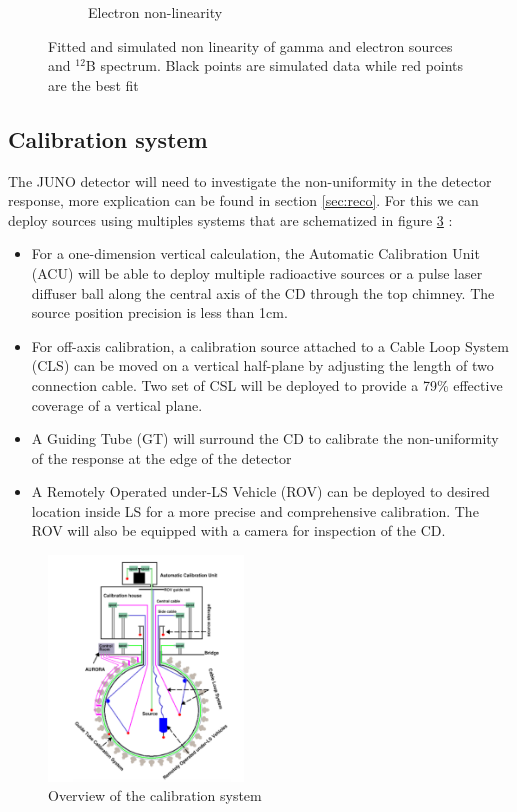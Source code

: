 \begin{figure}[ht]
\begin{subfigure}[b]{0.37\textwidth}
    \caption{Electron non-linearity}
    \label{fig:nl:electron}
  \end{subfigure}
  \caption{Fitted and simulated non linearity of gamma and electron sources and $^{12}$B spectrum. Black points are simulated data while red points are the best fit}
  \label{fig:nl}
\end{figure}

\subsection{Calibration system}

The JUNO detector will need to investigate the non-uniformity in the detector response, more explication can be found in section \ref{sec:reco}. For this we can deploy sources using multiples systems that are schematized in figure \ref{fig:calib} :

\begin{itemize}
  \item For a one-dimension vertical calculation, the Automatic Calibration Unit (ACU) will be able to deploy multiple radioactive sources or a pulse laser diffuser ball along the central axis of the CD through the top chimney. The source position precision is less than 1cm.
  \item For off-axis calibration, a calibration source attached to a Cable Loop System (CLS) can be moved on a vertical half-plane by adjusting the length of two connection cable. Two set of CSL will be deployed to provide a 79\% effective coverage of a vertical plane.
  \item A Guiding Tube (GT) will surround the CD to calibrate the non-uniformity of the response at the edge of the detector
  \item A Remotely Operated under-LS Vehicle (ROV) can be deployed to desired location inside LS for a more precise and comprehensive calibration. The ROV will also be equipped with a camera for inspection of the CD.
\end{itemize}

\begin{figure}[ht]
  \centering
  \includegraphics[height=6cm]{images/juno/calib.png}
  \caption{Overview of the calibration system}
  \label{fig:calib}
\end{figure}


